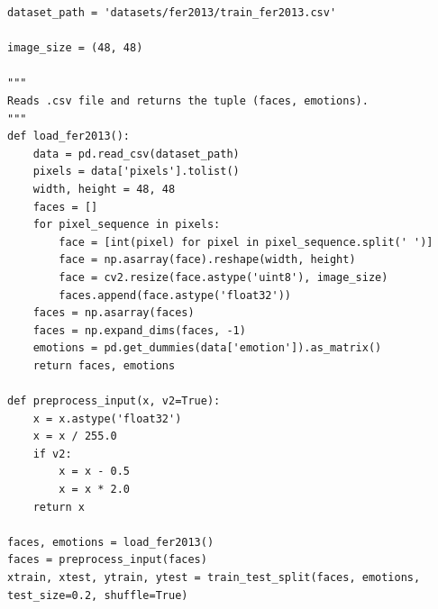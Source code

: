\documentclass[runningheads,a4paper,11pt]{report}
\begin{document}
\begin{appendices}
\begin{lstlisting}
dataset_path = 'datasets/fer2013/train_fer2013.csv'

image_size = (48, 48)

"""
Reads .csv file and returns the tuple (faces, emotions).
"""
def load_fer2013():
    data = pd.read_csv(dataset_path)
    pixels = data['pixels'].tolist()
    width, height = 48, 48
    faces = []
    for pixel_sequence in pixels:
        face = [int(pixel) for pixel in pixel_sequence.split(' ')]
        face = np.asarray(face).reshape(width, height)
        face = cv2.resize(face.astype('uint8'), image_size)
        faces.append(face.astype('float32'))
    faces = np.asarray(faces)
    faces = np.expand_dims(faces, -1)
    emotions = pd.get_dummies(data['emotion']).as_matrix()
    return faces, emotions
 
def preprocess_input(x, v2=True):
    x = x.astype('float32')
    x = x / 255.0
    if v2:
        x = x - 0.5
        x = x * 2.0
    return x
 
faces, emotions = load_fer2013()
faces = preprocess_input(faces)
xtrain, xtest, ytrain, ytest = train_test_split(faces, emotions, test_size=0.2, shuffle=True)
\end{lstlisting}

\clearpage

\end{appendices}
\end{document}
